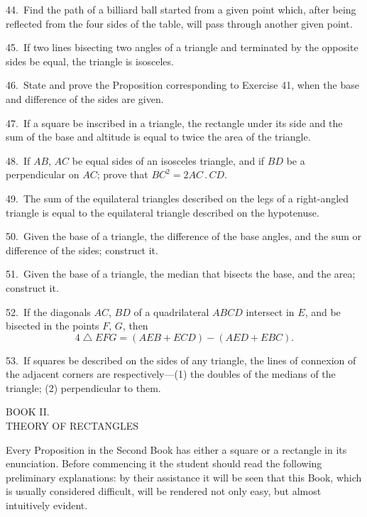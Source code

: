 \documentclass[oneside]{book}
\newcommand{\ibksp}{\hspace{-1.5em}}
\begin{document}
\begin{footnotesize}
44.~Find the path of a billiard ball started from a given point
which, after being reflected from the four sides of the table, will
pass through another given point.

45.~If two lines bisecting two angles of a triangle and terminated
by the opposite sides be equal, the triangle is isosceles.

46.~State and prove the Proposition corresponding to Exercise
41, when the base and difference of the sides are given.

47.~If a square be inscribed in a triangle, the rectangle under
its side and the sum of the base and altitude is equal to twice the
area of the triangle.

48.~If $AB$, $AC$ be equal sides of an isosceles triangle, and if
$BD$ be a perpendicular on $AC$; prove that $BC^2 = 2AC\,.\,CD$.

49.~The sum of the equilateral triangles described on the legs
of a right-angled triangle is equal to the equilateral triangle described
on the hypotenuse.

50.~Given the base of a triangle, the difference of the base
angles, and the sum or difference of the sides; construct it.

51.~Given the base of a triangle, the median that bisects the
base, and the area; construct it.

52.~If the diagonals $AC$, $BD$ of a quadrilateral $ABCD$ intersect
in $E$, and be bisected in the points $F$, $G$, then
\[
4 \; \triangle \; EFG = (AEB + ECD)-(AED + EBC).
\]

53.~If squares be described on the sides of any triangle, the
lines of connexion of the adjacent corners are respectively---(1) the
doubles of the medians of the triangle; (2) perpendicular to
them.
\par\end{footnotesize}



\newpage\begin{center}{\LARGE BOOK II\@.} \bigskip\\{\large \uppercase{Theory of Rectangles}}\\ \bigskip
{}
\addcontentsline{toc}{section}{\protect \ibksp\textsf{Theory of Rectangles,}}
\end{center}

\noindent Every Proposition in the Second Book has either a
square or a rectangle in its enunciation. Before commencing
it the student should read the following preliminary
explanations: by their assistance it will be
seen that this Book, which is usually considered difficult,
will be rendered not only easy, but almost intuitively
evident.\par\medskip
\end{document}
